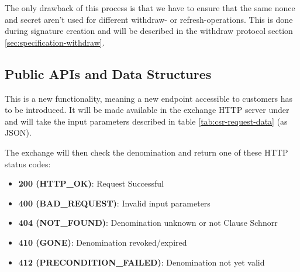 The only drawback of this process is that we have to ensure that the same nonce and secret aren't used for different withdraw- or refresh-operations.
This is done during signature creation and will be described in the withdraw protocol section \ref{sec:specification-withdraw}.


\subsection{Public APIs and Data Structures}
This is a new functionality, meaning a new endpoint accessible to customers has to be introduced.
It will be made available in the exchange HTTP server under  and will take the input parameters described in table \ref{tab:csr-request-data} (as \ac{JSON}).
\begin{table}[ht]
  \centering
\end{table}

The exchange will then check the denomination and return one of these HTTP status codes:
\begin{itemize}
  \item \textbf{200 (HTTP\_OK)}: Request Successful
  \item \textbf{400 (BAD\_REQUEST)}: Invalid input parameters
  \item \textbf{404 (NOT\_FOUND)}: Denomination unknown or not Clause Schnorr
  \item \textbf{410 (GONE)}: Denomination revoked/expired
  \item \textbf{412 (PRECONDITION\_FAILED)}: Denomination not yet valid
\end{itemize}

